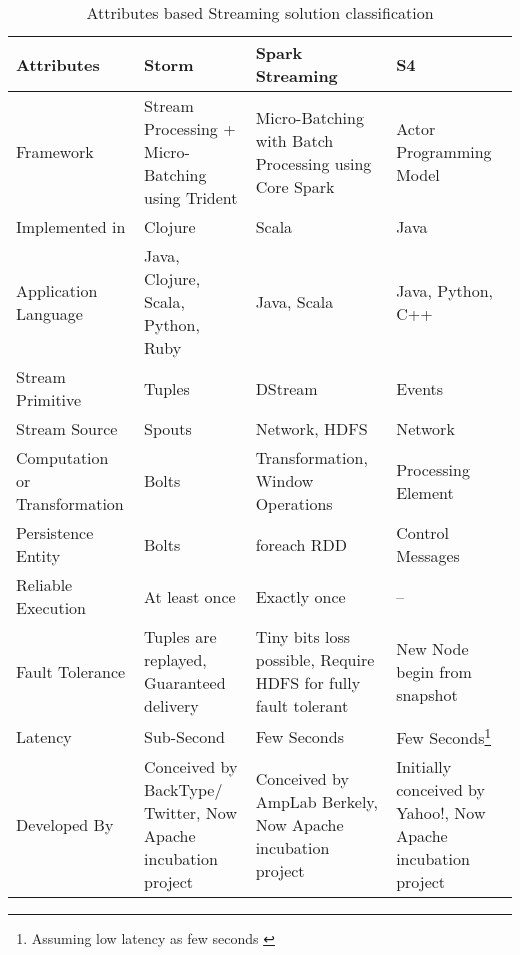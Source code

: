 \documentclass{acm_proc_article-sp}
\begin{document}
\def\arraystretch{1.2}\begin{table*}[!ht]
\begin{minipage}{\textwidth} 
\centering
\caption{Attributes based Streaming solution classification}
\begin{tabular}{| L{4cm} | L{4cm} | L{4cm} | L{4cm} |} \hline Attributes& Storm & Spark Streaming & S4\\ \hline

Framework & Stream Processing + Micro-Batching using Trident & Micro-Batching with Batch Processing using Core Spark & Actor Programming Model \\ \hline  

Implemented in & Clojure & Scala & Java \\  \hline 

Application Language & Java, Clojure, Scala, Python, Ruby  & Java, Scala & Java, Python, C++ \\ \hline

Stream Primitive & Tuples & DStream 	  & Events \\ \hline

Stream Source & Spouts & Network, HDFS & Network \\ \hline

Computation or Transformation  & Bolts & Transformation, Window Operations & Processing Element \\ \hline

Persistence Entity & Bolts & foreach RDD & Control Messages \\ \hline

Reliable  Execution & At least once & Exactly once & -- \\ \hline 

Fault Tolerance & Tuples are replayed, Guaranteed delivery & Tiny bits loss possible, Require HDFS for fully fault tolerant & New Node begin from snapshot \\  \hline

Latency & Sub-Second & Few Seconds & Few Seconds\footnote{Assuming low latency as few seconds \cite{Neumeyer:2010:SDS:1933306.1934385}} \\ \hline

Developed By & Conceived by BackType/ Twitter, Now Apache incubation project & Conceived by AmpLab Berkely, Now Apache incubation project & Initially conceived by Yahoo!, Now Apache incubation project \\


\hline\end{tabular}
\label{table:tab3}
\end{minipage}
\end{table*}
\end{document}
